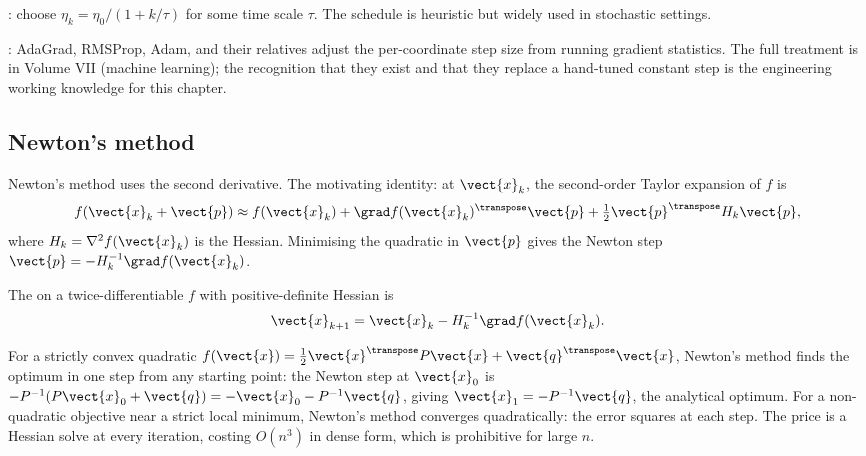 : choose $\eta_{k} = \eta_{0} /
(1 + k/\tau)$ for some time scale $\tau$. The schedule is
heuristic but widely used in stochastic settings.

: AdaGrad, RMSProp, Adam, and their
relatives adjust the per-coordinate step size from running
gradient statistics. The full treatment is in Volume VII
(machine learning); the recognition that they exist and that
they replace a hand-tuned constant step is the engineering
working knowledge for this chapter.

\subsection{Newton's method}

Newton's method uses the second derivative. The motivating
identity: at $\vect{x}_{k}$, the second-order Taylor expansion of
$f$ is
\[
f(\vect{x}_{k} + \vect{p}) \approx f(\vect{x}_{k}) +
\grad f(\vect{x}_{k})^{\transpose} \vect{p} +
\tfrac{1}{2} \vect{p}^{\transpose} H_{k} \vect{p},
\]
where $H_{k} = \nabla^{2} f(\vect{x}_{k})$ is the Hessian.
Minimising the quadratic in $\vect{p}$ gives the Newton step
$\vect{p} = -H_{k}^{-1} \grad f(\vect{x}_{k})$.

\begin{definition}
The  on a twice-differentiable $f$ with
positive-definite Hessian is
\[
\vect{x}_{k+1} = \vect{x}_{k} - H_{k}^{-1} \grad f(\vect{x}_{k}).
\]
\end{definition}

For a strictly convex quadratic $f(\vect{x}) = \tfrac{1}{2}
\vect{x}^{\transpose} P \vect{x} + \vect{q}^{\transpose}
\vect{x}$, Newton's method finds the optimum in one step from
any starting point: the Newton step at $\vect{x}_{0}$ is $-P^{-1}
(P \vect{x}_{0} + \vect{q}) = -\vect{x}_{0} - P^{-1} \vect{q}$,
giving $\vect{x}_{1} = -P^{-1} \vect{q}$, the analytical optimum.
For a non-quadratic objective near a strict local minimum,
Newton's method converges quadratically: the error squares at
each step. The price is a Hessian solve at every iteration,
costing $O(n^{3})$ in dense form, which is prohibitive for
large $n$.

